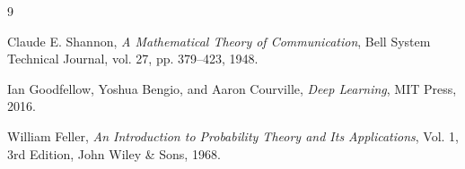 \documentclass[12pt]{article}
\begin{document}
\renewcommand{\refname}{\color{emerald} উদ্ধৃত রেফারেন্সসমূহ}
\begin{thebibliography}{9}

Claude E. Shannon, \textit{A Mathematical Theory of Communication}, Bell System Technical Journal, vol. 27, pp. 379--423, 1948.

Ian Goodfellow, Yoshua Bengio, and Aaron Courville, \textit{Deep Learning}, MIT Press, 2016.

William Feller, \textit{An Introduction to Probability Theory and Its Applications}, Vol. 1, 3rd Edition, John Wiley \& Sons, 1968.

\end{thebibliography}
\end{document}
